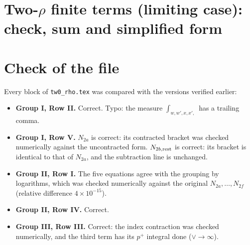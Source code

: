 \documentclass[10pt]{article}
\begin{document}
\section*{Two-$\rho$ finite terms (limiting case): check, sum and simplified form}
\section{Check of the file}
Every block of \texttt{tw0\_rho.tex} was compared with the versions verified earlier:
\begin{itemize}
\item \textbf{Group I, Row II.} Correct. Typo: the measure $\int_{w,w',x,x',}$ has a trailing comma.
\item \textbf{Group I, Row V.} $N_{2a}$ is correct: its contracted bracket was checked numerically against the uncontracted form. $N_{2b,\rm rest}$ is correct: its bracket is identical to that of $N_{2a}$, and the subtraction line is unchanged.
\item \textbf{Group II, Row I.} The five equations agree with the grouping by logarithms, which was checked numerically against the original $N_{2a},\dots,N_{2f}$ (relative difference $4\times10^{-15}$).
\item \textbf{Group II, Row IV.} Correct.
\item \textbf{Group III, Row III.} Correct: the index contraction was checked numerically, and the third term has its $p^{+}$ integral done ($\vee\to\infty$).
\end{itemize}
\end{document}

